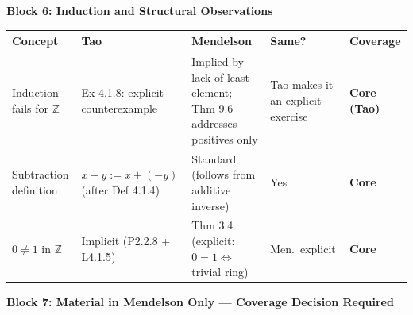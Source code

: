 \begin{exposition}
\bigskip
\end{exposition}

\noindent\textbf{Block 6: Induction and Structural Observations}

\begin{exposition}
\smallskip
\end{exposition}
\begin{tabular}{p{} p{} p{} p{} p{}}
\toprule
\textbf{Concept} & \textbf{Tao} & \textbf{Mendelson} & \textbf{Same?} & \textbf{Coverage} \\
\midrule

Induction fails for $\mathbb{Z}$
& Ex 4.1.8: explicit counterexample
& Implied by lack of least element; Thm 9.6 addresses positives only
& Tao makes it an explicit exercise
& \textbf{Core (Tao)}
\\[6pt]

Subtraction definition
& $x-y:=x+(-y)$ (after Def 4.1.4)
& Standard (follows from additive inverse)
& Yes
& \textbf{Core}
\\[6pt]

$0\neq 1$ in $\mathbb{Z}$
& Implicit (P2.2.8 + L4.1.5)
& Thm 3.4 (explicit: $0=1\iff$ trivial ring)
& Men.\ explicit
& \textbf{Core}
\\

\bottomrule
\end{tabular}

\begin{exposition}
\bigskip
\end{exposition}

\noindent\textbf{Block 7: Material in Mendelson Only --- Coverage Decision Required}

